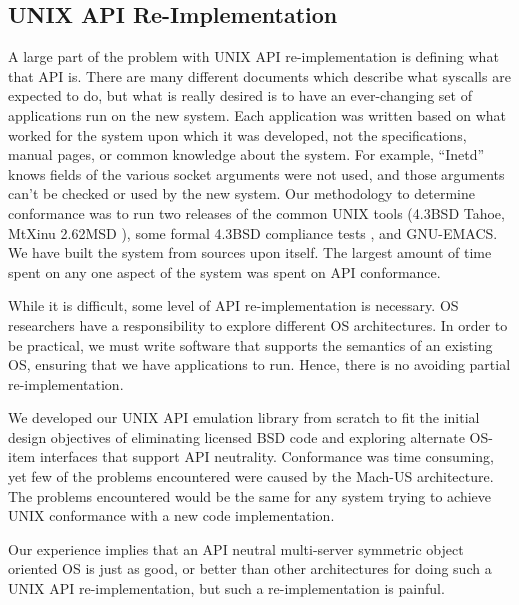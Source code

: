 \subsection{UNIX API Re-Implementation}
A large part of the problem with UNIX API re-implementation
is defining what that API is.  There are many different documents
which describe what syscalls are expected to do, but what is really
desired is to have an ever-changing set of applications run
on the new system.  Each application was written based on what
worked for the system upon which it was developed,
not the specifications, manual
pages, or common knowledge about the system.  For example, 
``Inetd'' knows fields of the various socket arguments
were not used, and those arguments can't be checked or used by the
new system.  Our methodology to determine conformance was to run two releases
of the common UNIX tools (4.3BSD Tahoe, MtXinu 2.62MSD \cite{STUMP}),
some formal 4.3BSD compliance tests \cite{COMP-TEST},
and GNU-EMACS.  We have built the system from sources upon itself.
The largest amount of time spent on any one aspect of the system was
spent on API conformance.

While it is difficult, some level of API re-implementation is necessary.
OS researchers have a responsibility to explore different OS
architectures.  In order to be practical, we must write software that
supports the semantics of an existing OS, ensuring that we have applications
to run.  Hence, there is no avoiding partial re-implementation.

We developed our UNIX API emulation library from scratch to fit the initial
design objectives of eliminating licensed BSD code
and exploring alternate OS-item interfaces that support API neutrality.
Conformance was time consuming, yet few
of the problems encountered were caused by the Mach-US architecture.
The problems encountered would be the same for any system
trying to achieve UNIX conformance with a new code implementation.

Our experience implies that an
API neutral multi-server symmetric object oriented OS is just as good, or
better than other architectures for doing such a UNIX API re-implementation,
but such a re-implementation is painful.


